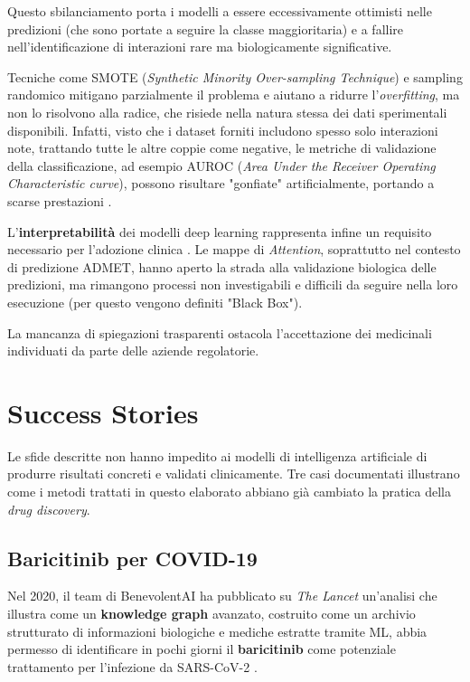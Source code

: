 Questo sbilanciamento porta i modelli a essere eccessivamente ottimisti nelle predizioni (che sono portate a seguire la classe maggioritaria) e a fallire nell'identificazione di interazioni rare ma biologicamente significative.

Tecniche come 
SMOTE (\textit{Synthetic Minority Over-sampling Technique}) e sampling randomico \cite{ahmadMachineLearningDrugtarget2026} mitigano parzialmente il problema e aiutano a ridurre l'\textit{overfitting}, 
ma non lo risolvono alla radice, che risiede nella natura 
stessa dei dati sperimentali disponibili. Infatti, visto che i dataset forniti includono spesso solo interazioni note, trattando tutte le altre coppie come negative, le metriche di validazione della classificazione, ad esempio AUROC (\textit{Area Under the Receiver Operating Characteristic curve}), possono risultare "gonfiate" artificialmente, portando a scarse prestazioni \cite{ahmadMachineLearningDrugtarget2026}.

L'\textbf{interpretabilità} dei modelli deep learning 
rappresenta infine un requisito necessario per 
l'adozione clinica \cite{wangUnifiedSurveyDrugtarget2026a}. 
Le mappe di \textit{Attention}, soprattutto nel contesto di predizione ADMET, hanno aperto la strada alla validazione biologica 
delle predizioni, ma rimangono processi non investigabili e difficili da seguire nella loro esecuzione (per questo vengono definiti "Black Box").

La mancanza di spiegazioni trasparenti ostacola l'accettazione dei medicinali individuati da parte delle aziende regolatorie.

\section{Success Stories}

Le sfide descritte non hanno impedito ai modelli di intelligenza 
artificiale di produrre risultati concreti e validati 
clinicamente. Tre casi documentati illustrano come i 
metodi trattati in questo elaborato abbiano già cambiato 
la pratica della \textit{drug discovery}.

\subsection{Baricitinib per COVID-19}

Nel 2020, il team di BenevolentAI ha pubblicato 
su \textit{The Lancet} un'analisi che illustra come un 
\textbf{knowledge graph} avanzato, costruito come un archivio strutturato di 
informazioni biologiche e mediche estratte tramite ML,
abbia permesso di identificare in pochi giorni il 
\textbf{baricitinib} come potenziale trattamento per 
l'infezione da SARS-CoV-2 
\cite{richardsonBaricitinibPotentialTreatment2020}.

